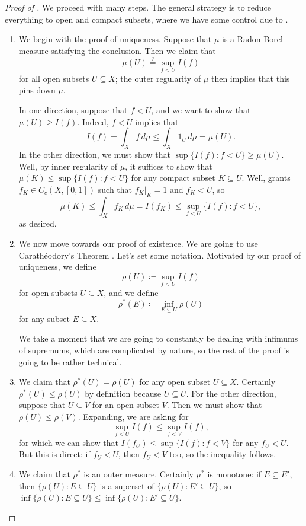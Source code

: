 \documentclass[../notes.tex]{subfiles}
\begin{document}
\begin{proof}[Proof of ]
	We proceed with many steps. The general strategy is to reduce everything to open and compact subsets, where we have some control due to .
	\begin{enumerate}
		\item We begin with the proof of uniqueness. Suppose that $\mu$ is a Radon Borel measure satisfying the conclusion. Then we claim that
		\[\mu(U)\stackrel?=\sup_{f<U}I(f)\]
		for all open subsets $U\subseteq X$; the outer regularity of $\mu$ then implies that this pins down $\mu$.
	
		In one direction, suppose that $f<U$, and we want to show that $\mu(U)\ge I(f)$. Indeed, $f<U$ implies that
		\[I(f)=\int_Xf\,d\mu\le\int_X1_U\,d\mu=\mu(U).\]
		In the other direction, we must show that $\sup\{I(f):f<U\}\ge\mu(U)$. Well, by inner regularity of $\mu$, it suffices to show that $\mu(K)\le\sup\{I(f):f<U\}$ for any compact subset $K\subseteq U$. Well,  grants $f_K\in C_c(X,[0,1])$ such that $f_K|_K=1$ and $f_K<U$, so
		\[\mu(K)\le\int_Xf_K\,d\mu=I(f_K)\le\sup_{f<U}\{I(f):f<U\},\]
		as desired.

		\item We now move towards our proof of existence. We are going to use Carath\'eodory's Theorem \cite[Theorem~6.21]{elber-top}. Let's set some notation. Motivated by our proof of uniqueness, we define
		\[\rho(U)\coloneqq\sup_{f<U}I(f)\]
		for open subsets $U\subseteq X$, and we define
		\[\rho^*(E)\coloneqq\inf_{E\subseteq U}\rho(U)\]
		for any subset $E\subseteq X$.

		We take a moment that we are going to constantly be dealing with infimums of supremums, which are complicated by nature, so the rest of the proof is going to be rather technical.
		
		\item We claim that $\rho^*(U)=\rho(U)$ for any open subset $U\subseteq X$. Certainly $\rho^*(U)\le\rho(U)$ by definition because $U\subseteq U$. For the other direction, suppose that $U\subseteq V$ for an open subset $V$. Then we must show that $\rho(U)\le\rho(V)$. Expanding, we are asking for
		\[\sup_{f<U}I(f)\le\sup_{f<V}I(f),\]
		for which we can show that $I(f_U)\le\sup\{I(f):f<V\}$ for any $f_U<U$. But this is direct: if $f_U<U$, then $f_U<V$ too, so the inequality follows.

		\item We claim that $\rho^*$ is an outer measure. Certainly $\mu^*$ is monotone: if $E\subseteq E'$, then $\{\rho(U):E\subseteq U\}$ is a superset of $\{\rho(U):E'\subseteq U\}$, so $\inf\{\rho(U):E\subseteq U\}\le\inf\{\rho(U):E'\subseteq U\}$.


\end{enumerate}
\end{proof}
\end{document}
